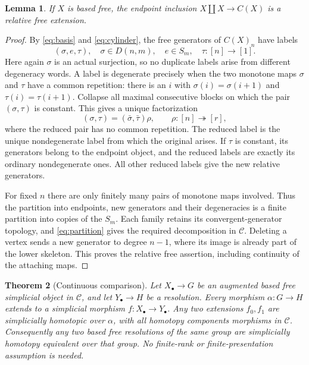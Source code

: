 \documentclass[10pt,a4paper]{amsart}
\newtheorem{theorem}{Theorem}[section]
\newtheorem{lemma}[theorem]{Lemma}
\newcommand{\C}{\mathcal C}
\begin{document}
\begin{lemma}\label{lem:cylinder}
If $X$ is based free, the endpoint inclusion
$X\amalg X\to C(X)$ is a relative free extension.
\end{lemma}
\begin{proof}
By \eqref{eq:basis} and \eqref{eq:cylinder}, the free generators of
$C(X)_n$ have labels
\[
 (\sigma,e,\tau),\quad
 \sigma\in D(n,m),\quad e\in S_m,\quad
 \tau:[n]\to[1].
\]
Here again $\sigma$ is an actual surjection, so no duplicate labels arise
from different degeneracy words. A label is degenerate precisely when
the two monotone maps $\sigma$ and $\tau$ have a common repetition: there is an $i$ with
$\sigma(i)=\sigma(i+1)$ and $\tau(i)=\tau(i+1)$.
Collapse all maximal consecutive blocks on which the pair
$(\sigma,\tau)$ is constant. This gives a unique factorization
\[
 (\sigma,\tau)=(\bar\sigma,\bar\tau)\rho,
 \qquad \rho:[n]\twoheadrightarrow[r],
\]
where the reduced pair has no common repetition. The reduced label
is the unique nondegenerate label from which the original arises.
If $\tau$ is constant, its generators belong to the endpoint object,
and the reduced labels are exactly its ordinary nondegenerate ones.
All other reduced labels give the new relative generators.

For fixed $n$ there are only finitely many pairs of monotone maps
involved. Thus the partition into endpoints, new generators and
their degeneracies is a finite partition into copies of the $S_m$.
Each family retains its convergent-generator topology, and
\eqref{eq:partition} gives the required decomposition in $\C$.
Deleting a vertex sends a new generator to degree $n-1$, where its
image is already part of the lower skeleton. This proves the
relative free assertion, including continuity of the attaching maps.
\end{proof}


\begin{theorem}[Continuous comparison]\label{thm:comparison}
Let $X_\bullet\to G$ be an augmented based free simplicial object
in $\C$, and let $Y_\bullet\to H$ be a resolution. Every morphism
$\alpha:G\to H$ extends to a simplicial morphism
$f:X_\bullet\to Y_\bullet$. Any two extensions $f_0,f_1$ are
simplicially homotopic over $\alpha$, with all homotopy components
morphisms in $\C$.
Consequently any two based free resolutions of the same group are
simplicially homotopy equivalent over that group. No finite-rank or
finite-presentation assumption is needed.
\end{theorem}
\end{document}
